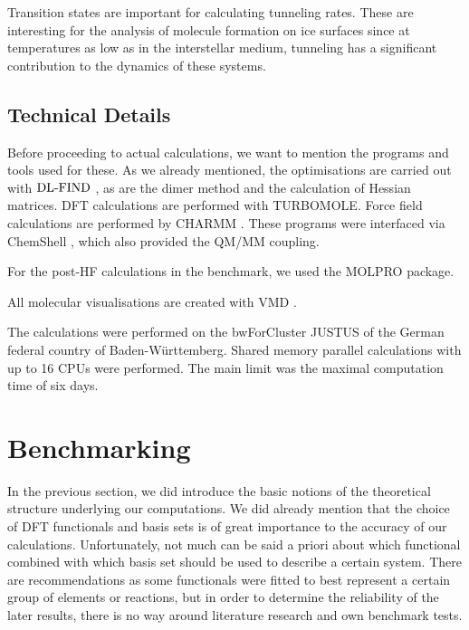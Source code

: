 \documentclass[8.5pt,twoside,twocolumn]{article}
\newcommand\dlfind{\enmat{\te{DL-FIND}}}
\theoremstyle{standard}
\begin{document}
Transition states are important for calculating tunneling rates. These are interesting
for the analysis of molecule formation on ice surfaces since at temperatures as low
as in the interstellar medium, tunneling has a significant contribution to the dynamics of 
these systems.

\subsection{Technical Details}

Before proceeding to actual calculations, we want to mention the programs and tools 
used for these. As we already mentioned, the optimisations are carried out with
$\dlfind$ \cite{Kaestner2009}, as are the dimer method and the calculation of 
Hessian matrices. DFT calculations are performed with TURBOMOLE\cite{TURBOMOLE}.
Force field calculations are performed by CHARMM \cite{CHARMM2009}. These programs were interfaced
via ChemShell \cite{chemshell}, which also provided the QM/MM coupling.

For the post-HF calculations in the benchmark, we used the MOLPRO \cite{MOLPRO_brief}
package.

All molecular visualisations are created with VMD \cite{HUMP96}.

The calculations were performed on the bwForCluster JUSTUS of the German federal country
of Baden-Württemberg. Shared memory parallel calculations with up to 16 CPUs
were performed. The main limit was the maximal computation time of six days.



\section{Benchmarking}
\newcommand\htohto{\mbox{\enmat{\hto-\hto}}}
\newcommand\htoo{\mbox{\enmat{\hto-\hspace{.2pt} ^3\te{O}}}}
\newcommand\htoh{\mbox{\enmat{\hto-\te H}}}
\label{Sec:Bench}

In the previous section, we did introduce the basic notions of the theoretical structure underlying our
computations. We did already mention that the choice of DFT functionals and basis sets is of great importance
to the accuracy of our calculations. Unfortunately, not much can be said a priori about
which functional combined with which basis set should be used to describe a certain system.
There are recommendations as some functionals were fitted to best represent a certain
group of elements or reactions, but in order to determine the reliability of the
later results, there is no way around literature research and own benchmark tests.
\end{document}
